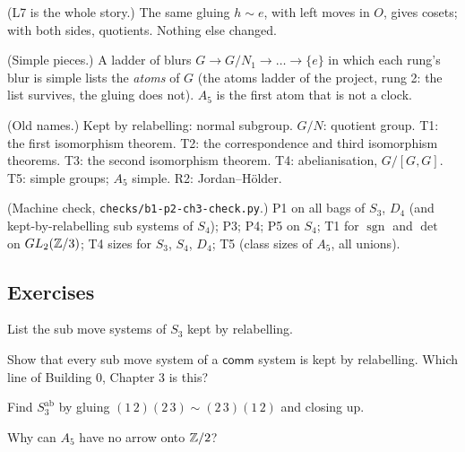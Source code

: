 \begin{lines}
\item[\lab{R1}] (L7 is the whole story.) The same gluing $h \sim e$, with left moves in $O$, gives cosets; with both sides, quotients. Nothing else changed.
\item[\lab{R2}] (Simple pieces.) A ladder of blurs $G \to G/N_1 \to \dots \to \{e\}$ in which each rung's blur is simple lists the \emph{atoms} of $G$ (the atoms ladder of the project, rung 2: the list survives, the gluing does not). $A_5$ is the first atom that is not a clock.
\item[\lab{R3}] (Old names.) Kept by relabelling: normal subgroup. $G/N$: quotient group. T1: the first isomorphism theorem. T2: the correspondence and third isomorphism theorems. T3: the second isomorphism theorem. T4: abelianisation, $G/[G, G]$. T5: simple groups; $A_5$ simple. R2: Jordan--H\"older.
\item[\lab{R4}] (Machine check, \texttt{checks/b1-p2-ch3-check.py}.) P1 on all bags of $S_3$, $D_4$ (and kept-by-relabelling sub systems of $S_4$); P3; P4; P5 on $S_4$; T1 for $\operatorname{sgn}$ and $\det$ on $GL_2(\mathbb{Z}/3)$; T4 sizes for $S_3$, $S_4$, $D_4$; T5 (class sizes of $A_5$, all unions).
\end{lines}

\subsection*{Exercises}

\begin{lines}
\item[\lab{E1}] List the sub move systems of $S_3$ kept by relabelling.
\item[\lab{E2}] Show that every sub move system of a $\mathsf{comm}$ system is kept by relabelling. Which line of Building 0, Chapter 3 is this?
\item[\lab{E3}] Find $S_3^{\mathrm{ab}}$ by gluing $(1\,2)(2\,3) \sim (2\,3)(1\,2)$ and closing up.
\item[\lab{E4}] Why can $A_5$ have no arrow onto $\mathbb{Z}/2$?
\end{lines}

\newpage

